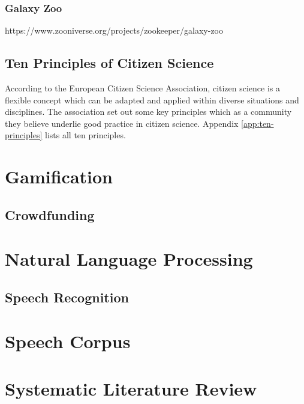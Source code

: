 \subsubsection{Galaxy Zoo}

https://www.zooniverse.org/projects/zookeeper/galaxy-zoo

\subsection{Ten Principles of Citizen Science}

According to the European Citizen Science Association, citizen science is a flexible concept which can be adapted and applied within diverse situations and disciplines. The association set out some key principles which as a community they believe underlie good practice in citizen science. Appendix \ref{app:ten-principles} lists all ten principles.

\section{Gamification}

\subsection{Crowdfunding}

\section{Natural Language Processing}

\subsection{Speech Recognition}

\section{Speech Corpus}

\section{Systematic Literature Review}

